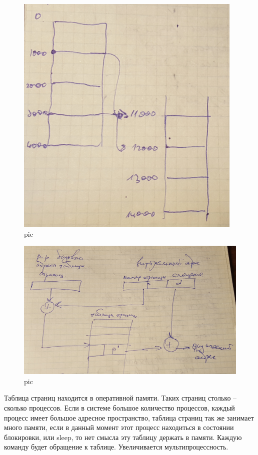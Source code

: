 \begin{figure}[H]
    \centering
    \includegraphics[width=\textwidth]{pic/4.png}
    \caption{pic}
\end{figure}

\begin{figure}[H]
    \centering
    \includegraphics[width=\textwidth]{pic/5.png}
    \caption{pic}
\end{figure}

Таблица страниц находится в оперативной памяти. Таких страниц столько – сколько процессов. Если в системе большое количество процессов, каждый процесс имеет большое адресное пространство, таблица страниц так же занимает много памяти, если в данный момент этот процесс находиться в состоянии блокировки, или sleep, то нет смысла эту таблицу держать в памяти. Каждую команду будет обращение к таблице. Увеличивается мультипроцессность. 